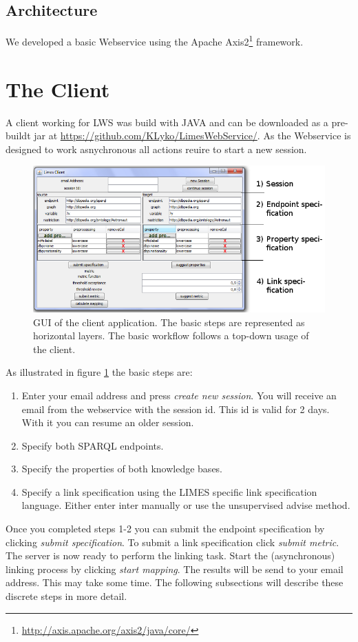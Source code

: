 \documentclass{article}
\begin{document}
\subsection{Architecture}
We developed a basic Webservice using the Apache Axis2\footnote{\url{http://axis.apache.org/axis2/java/core/}} framework. 

\newpage
\section{The Client}
A client working for LWS was build with JAVA and can be downloaded as a pre-buildt jar at \url{https://github.com/KLyko/LimesWebService/}. As the Webservice is designed to work asnychronous all actions reuire to start a new session.\\
\begin{figure}[h]
	\centering
		\includegraphics[width=7in]{images/Client_tasks.png}
	\caption{GUI of the client application. The basic steps are represented as horizontal layers. The basic workflow follows a top-down usage of the client.}
	\label{fig:client_tasks}
\end{figure}
As illustrated in figure \ref{fig:client_tasks} the basic steps are:
\begin{enumerate}
	\item Enter your email address and press \textit{create new session}. You will receive an email from the webservice with the session id. This id is valid for 2 days. With it you can resume an older session.
	\item Specify both SPARQL endpoints.
	\item Specify the properties of both knowledge bases. 
	\item Specify a link specification using the LIMES specific link specification language. Either enter inter manually or use the unsupervised advise method.
\end{enumerate}
Once you completed steps 1-2 you can submit the endpoint specification by clicking \textit{submit specification}. To submit a link specification click \textit{submit metric}. The server is now ready to perform the linking task. Start the (asynchronous) linking process by clicking \textit{start mapping}. The results will be send to your email address. This may take some time.
The following subsections will describe these discrete steps in more detail.
\end{document}
